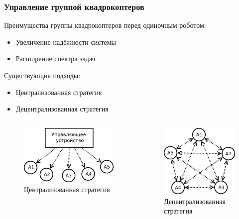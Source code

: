 \documentclass[10pt]{beamer}
\begin{document}
\begin{frame}
	\frametitle{Управление группой квадрокоптеров}
	Преимущества группы квадрокоптеров перед одиночным роботом:
	\begin{itemize}
		\item Увеличение надёжности системы
		\item Расширение спектра задач
	\end{itemize}
	\bigskip
	Существующие подходы:
	\begin{itemize}
		\item Централизованная стратегия
		\item Децентрализованная стратегия
	\end{itemize}
 	\begin{columns}
	\begin{figure}
		\centering
		\includegraphics[width=0.8\linewidth]{others/centr-platoon-controll2}
		\caption{Централизованная стратегия}
		\label{fig:centr-platoon-controll}
	\end{figure}
	\begin{figure}
		\centering
		\includegraphics[width=0.63\linewidth]{others/decen-platoon-collective}
		\caption{Децентрализованная стратегия}
		\label{fig:decen-platoon-collective}
	\end{figure}
\end{columns}
\end{frame}
\end{document}
